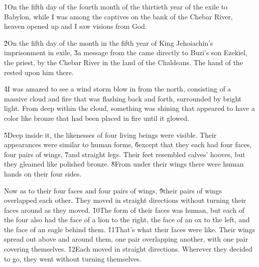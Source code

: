 


\v{1}On the fifth day of the fourth month of the thirtieth year of the exile to Babylon, while I was among the captives on the bank of the Chebar River, heaven opened up and I saw visions from God.

\v{2}On the fifth day of the month in the fifth year of King Jehoiachin's imprisonment in exile, \v{3}a message from the  came directly to Buzi's son Ezekiel, the priest, by the Chebar River in the land of the Chaldeans. The hand of the  rested upon him there.

\v{4}I was amazed to see a wind storm blow in from the north, consisting of a massive cloud and fire that was flashing back and forth, surrounded by bright light. From deep within the cloud, something was shining that appeared to have a color like bronze that had been placed in fire until it glowed.

\v{5}Deep inside it, the likenesses of four living beings were visible. Their appearances were similar to human forms, \v{6}except that they each had four faces, four pairs of wings, \v{7}and straight legs. Their feet resembled calves' hooves, but they gleamed like polished bronze. \v{8}From under their wings there were human hands on their four sides.

Now as to their four faces and four pairs of wings, \v{9}their pairs of wings overlapped each other. They moved in straight directions without turning their faces around as they moved. \v{10}The form of their faces was human, but each of the four also had the face of a lion to the right, the face of an ox to the left, and the face of an eagle behind them. \v{11}That's what their faces were like. Their wings spread out above and around them, one pair overlapping another, with one pair covering themselves. \v{12}Each moved in straight directions. Wherever they decided to go, they went without turning themselves.

